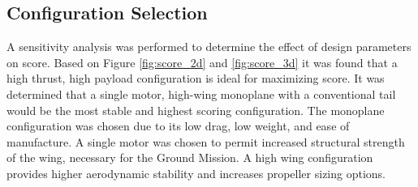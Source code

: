 
\subsection{Configuration Selection} %
A sensitivity analysis was performed to determine the effect of design parameters on score. Based on Figure \ref{fig:score_2d} and \ref{fig:score_3d} it was found that a high thrust, high payload configuration is ideal for maximizing score. It was determined that a single motor, high-wing monoplane with a conventional tail would be the most stable and highest scoring configuration. The monoplane configuration was chosen due to its low drag, low weight, and ease of manufacture. A single motor was chosen to permit increased structural strength of the wing, necessary for the Ground Mission. A high wing configuration provides higher aerodynamic stability and increases propeller sizing options.\\
